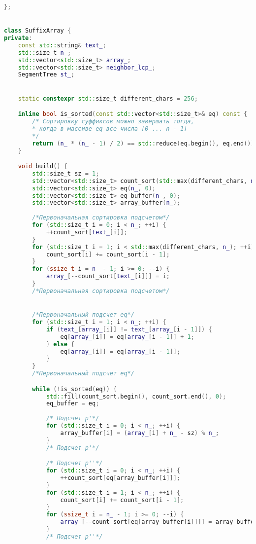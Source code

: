 \begin{lstlisting}[language=C++]
};


class SuffixArray {
private:
    const std::string& text_;
    std::size_t n_;
    std::vector<std::size_t> array_;
    std::vector<std::size_t> neighbor_lcp_;
    SegmentTree st_;


    static constexpr std::size_t different_chars = 256;

    inline bool is_sorted(const std::vector<std::size_t>& eq) const {
        /* Сортировку суффиксов можно завершать тогда,
        * когда в массиве eq все числа [0 ... n - 1]
        */
        return (n_ * (n_ - 1) / 2) == std::reduce(eq.begin(), eq.end());
    }

    void build() {
        std::size_t sz = 1;
        std::vector<std::size_t> count_sort(std::max(different_chars, n_), 0);
        std::vector<std::size_t> eq(n_, 0);
        std::vector<std::size_t> eq_buffer(n_, 0);
        std::vector<std::size_t> array_buffer(n_);
        
        /*Первоначальная сортировка подсчетом*/
        for (std::size_t i = 0; i < n_; ++i) {
            ++count_sort[text_[i]];
        }
        for (std::size_t i = 1; i < std::max(different_chars, n_); ++i) {
            count_sort[i] += count_sort[i - 1];
        }
        for (ssize_t i = n_ - 1; i >= 0; --i) {
            array_[--count_sort[text_[i]]] = i;
        }
        /*Первоначальная сортировка подсчетом*/


        /*Первоначальный подсчет eq*/
        for (std::size_t i = 1; i < n_; ++i) {
            if (text_[array_[i]] != text_[array_[i - 1]]) {
                eq[array_[i]] = eq[array_[i - 1]] + 1;
            } else {
                eq[array_[i]] = eq[array_[i - 1]];
            }
        }
        /*Первоначальный подсчет eq*/

        while (!is_sorted(eq)) {
            std::fill(count_sort.begin(), count_sort.end(), 0);
            eq_buffer = eq;
            
            /* Подсчет p'*/
            for (std::size_t i = 0; i < n_; ++i) {
                array_buffer[i] = (array_[i] + n_ - sz) % n_;
            }
            /* Подсчет p'*/

            /* Подсчет p''*/
            for (std::size_t i = 0; i < n_; ++i) {
                ++count_sort[eq[array_buffer[i]]];
            }
            for (std::size_t i = 1; i < n_; ++i) {
                count_sort[i] += count_sort[i - 1];
            }
            for (ssize_t i = n_ - 1; i >= 0; --i) {
                array_[--count_sort[eq[array_buffer[i]]]] = array_buffer[i];
            }
            /* Подсчет p''*/
            

\end{lstlisting}
